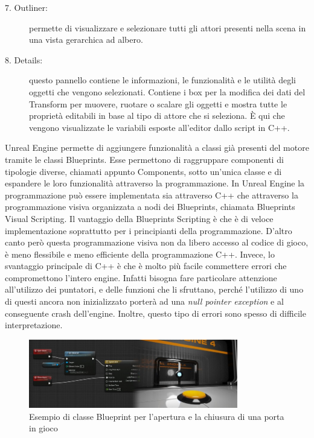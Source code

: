 \begin{description}
    \item [7. Outliner:] permette di visualizzare e selezionare tutti gli attori presenti nella scena in una vista gerarchica ad albero.
    \item [8. Details:] questo pannello contiene le informazioni, le funzionalità e le utilità degli oggetti che vengono selezionati. Contiene i box per la modifica dei dati del Transform per muovere, ruotare o scalare gli oggetti e mostra tutte le proprietà editabili in base al tipo di attore che si seleziona. È qui che vengono visualizzate le variabili esposte all'editor dallo script in C++.
\end{description}

Unreal Engine permette di aggiungere funzionalità a classi già presenti del motore tramite le classi Blueprints.
%
Esse permettono di raggruppare componenti di tipologie diverse, chiamati appunto Components, sotto un'unica classe e di espandere le loro funzionalità attraverso la programmazione.
%
In Unreal Engine la programmazione può essere implementata sia attraverso C++ che attraverso la programmazione visiva organizzata a nodi dei Blueprints, chiamata Blueprints Visual Scripting. 
%
Il vantaggio della Blueprints Scripting è che è di veloce implementazione soprattutto per i principianti della programmazione. 
%
D'altro canto però questa programmazione visiva non da libero accesso al codice di gioco, è meno flessibile e meno efficiente della programmazione C++.
%
Invece, lo svantaggio principale di C++ è che è molto più facile commettere errori che compromettono l'intero engine.
%
Infatti bisogna fare particolare attenzione all'utilizzo dei puntatori, e delle funzioni che li sfruttano, perché l'utilizzo di uno di questi ancora non inizializzato porterà ad una \textit{null pointer exception} e al conseguente crash dell'engine.
%
Inoltre, questo tipo di errori sono spesso di difficile interpretazione.

\begin{figure}[!ht]
    \centering
    \includegraphics[height=3cm]{figure/BlueprintClass.jpg}
    \caption{Esempio di classe Blueprint per l'apertura e la chiusura di una porta in gioco}
\end{figure}

